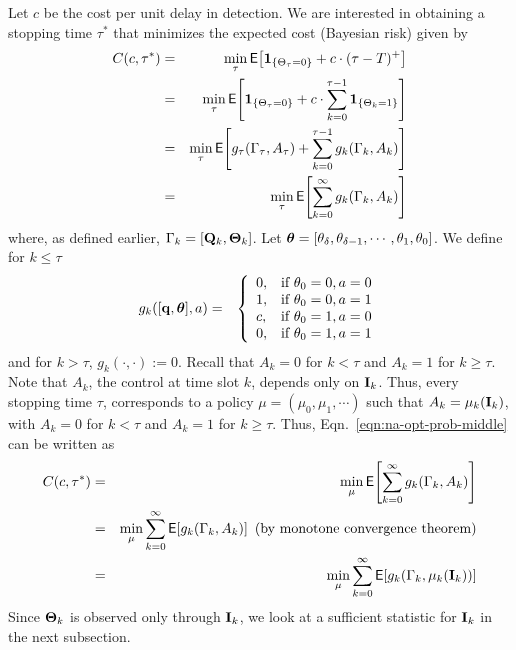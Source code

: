 \documentclass[acmtosn]{acmtrans2m}
\newcommand{\EXP}[1]{\mathsf{E}\!\left[#1\right]}
\newcommand{\nn}{\nonumber \\}
{\theorembodyfont{\rmfamily}
\newtheorem{remarks}{Remark}[section]} \newtheorem{theorem}{Theorem}
\begin{document}
Let $c$ be the cost per unit delay in detection. We are interested in 
obtaining a stopping time $\tau^*$ that minimizes the expected cost
(Bayesian risk) given by
\begin{eqnarray}
\label{eqn:na-opt-prob-middle} 
 C(c,\tau^*) 
& = & \min_\tau \EXP{{\bf 1}_{\{\Theta_\tau = 0\}} + c \cdot (\tau-T)^+ } \nn
& = & \min_\tau \EXP{{\bf 1}_{\{\Theta_\tau = 0\}} 
       + c \cdot \sum_{k=0}^{\tau-1} {\bf 1}_{\{\Theta_k = 1\}}  } \nn
& = & \min_\tau \EXP{g_\tau(\Gamma_\tau,A_\tau) +  \sum_{k=0}^{\tau-1} g_k(\Gamma_k,A_k)  }\nn 
& = & \min_\tau \EXP{ \sum_{k=0}^{\infty} g_k(\Gamma_k,A_k)}
\end{eqnarray}
where, as defined earlier, $\Gamma_k = [{\bf Q}_k, {\bf \Theta}_k]$.
Let ${\mbox{\boldmath$\theta$}} = [\theta_\delta,
\theta_{\delta-1},\cdots,\theta_1,\theta_0]$. We define for $k \leqslant
\tau$
\begin{eqnarray}
\label{eqn:g-defn}
g_k([{\bf q}, {\mbox{\boldmath$\theta$}}] ,a) 
& = & 
\left\{
\begin{array}{ll}
    0, & \text{if} \ \theta_0 = 0,  a = 0\\
    1, & \text{if} \ \theta_0 = 0,  a = 1\\
    c, & \text{if} \ \theta_0 = 1,  a = 0\\
    0, & \text{if} \ \theta_0 = 1,  a = 1
\end{array}
\right.
\end{eqnarray}
and for $k > \tau$, $g_k(\cdot, \cdot) :=0$. 
Recall that $A_k = 0$ for $k < \tau$ and $A_k = 1$ for $k \geqslant \tau$.
Note that $A_k$, the control at time slot $k$, depends only on ${\bf I}_k$.
Thus, every stopping time $\tau$, corresponds to a policy 
$\mu = (\mu_0,\mu_1,\cdots)$ such that 
$A_k = \mu_k({\bf I}_k)$, with $A_k = 0$ for $k < \tau$ and 
$A_k = 1$ for $k \geqslant \tau$. Thus,  
Eqn.~\ref{eqn:na-opt-prob-middle} can be written as  
\begin{eqnarray}
\label{eqn:na-opt-prob} 
 C(c,\tau^*) 
& = & \min_\mu \EXP{\sum_{k=0}^\infty g_k(\Gamma_k,A_k) }\nn
& = & \min_\mu \sum_{k=0}^\infty \EXP{ g_k(\Gamma_k,A_k) } \ \text{(by
monotone convergence theorem)} \nn
& = & \min_\mu \sum_{k=0}^\infty \EXP{ g_k(\Gamma_k,\mu_k({\bf I}_k)) }
\end{eqnarray}
Since ${\bf \Theta}_k$ is observed
only through ${\bf I}_k$, we look at a sufficient statistic for ${\bf I}_k$ in the next
subsection.
\end{document}
